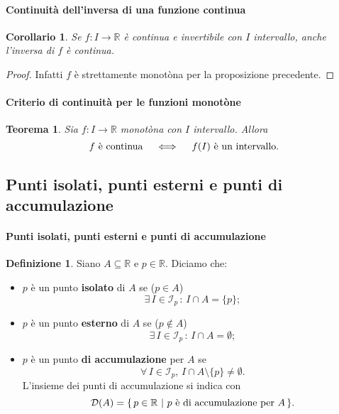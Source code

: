 \documentclass{article}
\theoremstyle{plain}
\newtheorem{thm}{Teorema}[section]
\newtheorem{cor}{Corollario}
\theoremstyle{definition}
\newtheorem{defn}{Definizione}[section]
\theoremstyle{remark}
\begin{document}
\vspace{10pt}

\paragraph{Continuità dell'inversa di una funzione continua}
\begin{bxthm}
\begin{cor}
    Se $f:I\to\mathbb{R}$ è continua e invertibile con $I$ intervallo, anche l'inversa di $f$ è continua.
\end{cor}
\end{bxthm}
\begin{proof}
    Infatti $f$ è strettamente monotòna per la proposizione precedente.
\end{proof}

\vspace{10pt}

\paragraph{Criterio di continuità per le funzioni monotòne}
\begin{bxthm}
\begin{thm}
    Sia $f:I\to\mathbb{R}$ monotòna con $I$ intervallo. Allora 
    \[f\textup{ è continua}\quad\iff\quad f(I) \textup{ è un intervallo}.\]
\end{thm}
\end{bxthm}

\vspace{10pt}

\subsection{Punti isolati, punti esterni e punti di accumulazione}

\vspace{10pt}

\paragraph{Punti isolati, punti esterni e punti di accumulazione}
\begin{bxthm}
\begin{defn}
    Siano $A\subseteq\mathbb{R}$ e $p\in\mathbb{R}$. Diciamo che:
    \begin{itemize}
        \item $p$ è un punto \textbf{isolato} di $A$ se ($p\in A$)
        \[\exists\, I\in \mathcal{I}_p\,:\,I\cap A=\{p\};\]
        \item $p$ è un punto \textbf{esterno} di $A$ se ($p\notin A$)
        \[\exists\, I\in \mathcal{I}_p\,:\, I\cap A=\emptyset;\]
        \item $p$ è un punto \textbf{di accumulazione} per $A$ se 
        \[\forall\, I\in \mathcal{I}_p,\, I\cap A\setminus\{p\}\neq\emptyset.\]
        L'insieme dei punti di accumulazione si indica con 
        \[\mathcal{D}(A)=\{\,p\in\mathbb{R} \ | \ p \textup{ è di accumulazione per }A\,\}.\]
    \end{itemize}
\end{defn}
\end{bxthm}
\end{document}

